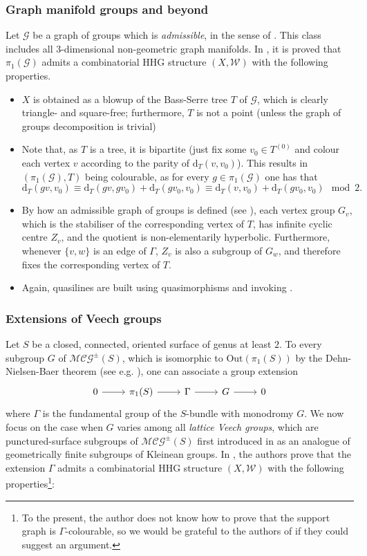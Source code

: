 \documentclass[svgnames]{amsart}
\theoremstyle{plain}
\theoremstyle{definition}
\newcommand{\dist}{\mathrm{d}}
\newcommand{\W}{\mathcal{W}}
\newcommand{\MCG}{\mathcal{MCG}^\pm}
\begin{document}
\subsubsection{Graph manifold groups and beyond}\label{subsec:example_pi1}
Let $\mathcal G$ be a graph of groups which is \emph{admissible}, in the sense of \cite{croke-Kleiner}. This class includes all $3$-dimensional non-geometric graph manifolds. In \cite{HRSS_3manifold}, it is proved that $\pi_1(\mathcal G)$ admits a combinatorial HHG structure $(X,\W)$ with the following properties.

\begin{itemize}
    \item $X$ is obtained as a blowup of the Bass-Serre tree $T$ of $\mathcal G$, which is clearly triangle- and square-free; furthermore, $T$ is not a point (unless the graph of groups decomposition is trivial)
    \item Note that, as $T$ is a tree, it is bipartite (just fix some $v_0\in T^{(0)}$ and colour each vertex $v$ according to the parity of $\dist_T(v,v_0)$). This results in $(\pi_1(\mathcal G),T)$ being colourable, as for every $g\in \pi_1(\mathcal G)$ one has that $$\dist_T(gv, v_0)\equiv \dist_T(gv, gv_0)+\dist_T(gv_0, v_0)\equiv \dist_T(v,v_0)+\dist_T(gv_0, v_0)\mod 2.$$
    \item By how an admissible graph of groups is defined (see \cite[Definition 2.13]{HRSS_3manifold}), each vertex group $G_v$, which is the stabiliser of the corresponding vertex of $T$, has infinite cyclic centre $Z_v$, and the quotient is non-elementarily hyperbolic. Furthermore, whenever $\{v,w\}$ is an edge of $\Gamma$, $Z_v$ is also a subgroup of $G_w$, and therefore fixes the corresponding vertex of $T$.
    \item Again, quasilines are built using quasimorphisms and invoking \cite[Lemma 4.15]{ABO}.
\end{itemize}


\subsubsection{Extensions of Veech groups}\label{subsec:example_veech}
Let $S$ be a closed, connected, oriented surface of genus at least $2$. To every subgroup $G$ of $\MCG(S)$, which is isomorphic to $\text{Out}(\pi_1(S))$ by the Dehn-Nielsen-Baer theorem (see e.g. \cite[Theorem 8.1]{FarbMargalit}), one can associate a group extension 
$$\begin{tikzcd}
    0\ar{r}&\pi_1(S)\ar{r}&\Gamma\ar{r}&G\ar{r}&0
\end{tikzcd}$$
where $\Gamma$ is the fundamental group of the $S$-bundle with monodromy $G$. We now focus on the case when $G$ varies among all \emph{lattice Veech groups}, which are punctured-surface subgroups of $\MCG(S)$ first introduced in \cite{Mosher_ext} as an analogue of geometrically finite subgroups of Kleinean groups. In \cite{veech}, the authors prove that the extension $\Gamma$ admits a combinatorial HHG structure $(X,\W)$ with the following properties\footnote{To the present, the author does not know how to prove that the support graph is $\Gamma$-colourable, so we would be grateful to the authors of \cite{veech} if they could suggest an argument.}:
\end{document}

